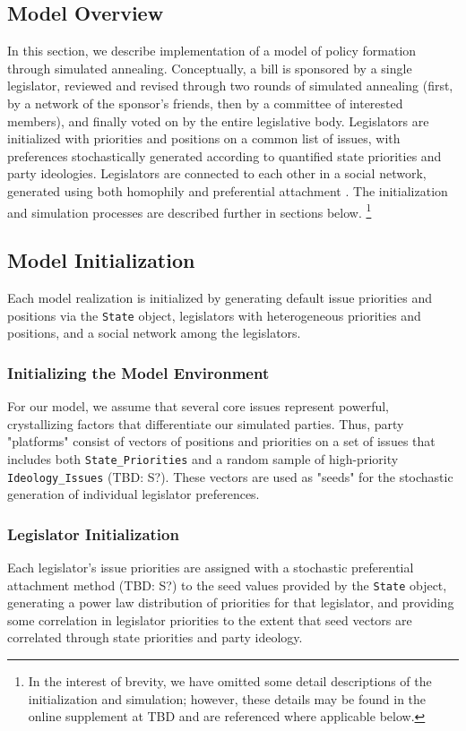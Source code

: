 \documentclass[pdftex,12pt]{llncs}
\begin{document}
\subsection{Model Overview}
In this section, we describe implementation of a model of policy formation through simulated annealing.
Conceptually, a bill is sponsored by a single legislator, reviewed and revised through two rounds of simulated annealing (first, by a network of the sponsor's friends, then by a committee of interested members), and finally voted on by the entire legislative body.
Legislators are initialized with priorities and positions on a common list of issues, with preferences stochastically generated according to quantified state priorities and party ideologies.
Legislators are connected to each other in a social network, generated using both homophily \parencite{msc01, br11} and preferential attachment \parencite{Barabasi1999}.
The initialization and simulation processes are described further in sections below.
\footnote{In the interest of brevity, we have omitted some detail descriptions of the initialization and simulation; however, these details may be found in the online supplement at TBD and are referenced where applicable below.}
\subsection{Model Initialization}
Each model realization is initialized by generating default issue priorities and positions via the \texttt{State} object, legislators with heterogeneous priorities and positions, and a social network among the legislators.
\subsubsection{Initializing the Model Environment}
For our model, we assume that several core issues represent powerful, crystallizing factors that differentiate our simulated parties.
Thus, party "platforms" consist of vectors of positions and priorities on a set of issues that includes both \texttt{State\_Priorities} and a random sample of high-priority \texttt{Ideology\_Issues} (TBD: S?).
These vectors are used as "seeds" for the stochastic generation of individual legislator preferences.
\subsubsection{Legislator Initialization}
Each legislator's issue priorities are assigned with a stochastic preferential attachment method (TBD: S?) to the seed values provided by the \texttt{State} object, generating a power law distribution of priorities for that legislator, and providing some correlation in legislator priorities to the extent that seed vectors are correlated through state priorities and party ideology.
\end{document}
